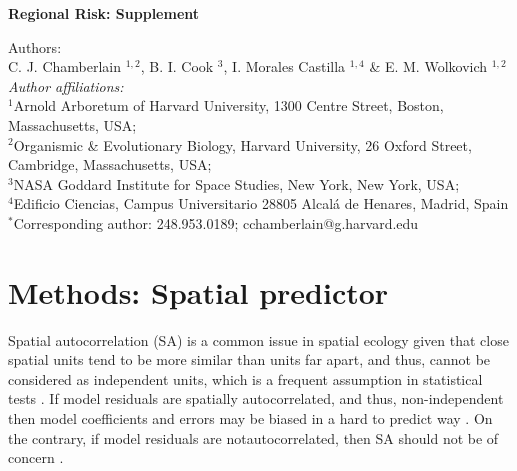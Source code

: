 \documentclass{article}\usepackage[]{graphicx}\usepackage[]{color}
\begin{document}
\noindent \textbf{\Large{Regional Risk: Supplement}}

\noindent Authors:\\
C. J. Chamberlain $^{1,2}$, B. I. Cook $^{3}$, I. Morales Castilla $^{1,4}$ \& E. M. Wolkovich $^{1,2}$
\vspace{2ex}\\
\emph{Author affiliations:}\\
$^{1}$Arnold Arboretum of Harvard University, 1300 Centre Street, Boston, Massachusetts, USA; \\
$^{2}$Organismic \& Evolutionary Biology, Harvard University, 26 Oxford Street, Cambridge, Massachusetts, USA; \\
$^{3}$NASA Goddard Institute for Space Studies, New York, New York, USA; \\
$^{4}$Edificio Ciencias, Campus Universitario 28805 Alcalá de Henares, Madrid, Spain \\
\vspace{2ex}
$^*$Corresponding author: 248.953.0189; cchamberlain@g.harvard.edu\\

\renewcommand{\thetable}{\arabic{table}}
\renewcommand{\thefigure}{\arabic{figure}}
\renewcommand{\labelitemi}{$-$}

\section*{Methods: Spatial predictor} %

Spatial autocorrelation (SA) is a common issue in spatial ecology given that close spatial units tend to be more similar than units far apart, and thus, cannot be considered as independent units, which is a frequent assumption in statistical tests \citep{diniz2003spatial}. If model residuals are spatially autocorrelated, and thus, non-independent then model coefficients and errors may be biased in a hard to predict way \citep{mauricio2009coefficient}. On the contrary, if model residuals are notautocorrelated, then SA should not be of concern \citep{hawkins2012eight}.\\
\end{document}
